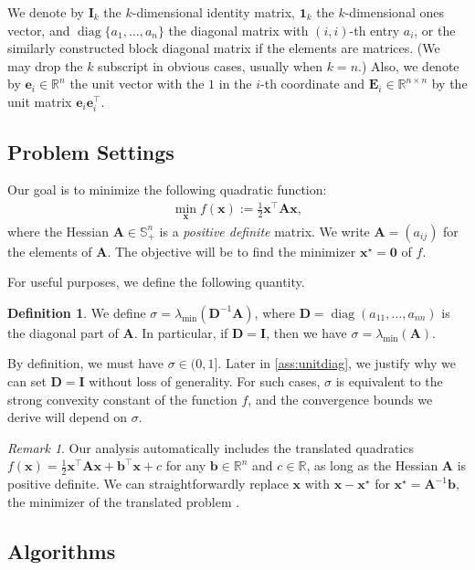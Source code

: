 \documentclass{article}
\theoremstyle{plain}
\theoremstyle{definition}
\newtheorem{definition}[theorem]{Definition}
\theoremstyle{remark}
\newtheorem*{remark*}{Remark} %
\def\vone{{\bm{1}}}
\def\vb{{\bm{b}}}
\def\ve{{\bm{e}}}
\def\vx{{\bm{x}}}
\def\mA{{\bm{A}}}
\def\mD{{\bm{D}}}
\def\mE{{\bm{E}}}
\def\mI{{\bm{I}}}
\def\sS{{\mathbb{S}}}
\newcommand{\R}{\mathbb{R}}
\DeclareMathOperator{\diag}{diag}
\begin{document}
We denote by $\mI_k$ the $k$-dimensional identity matrix, $\vone_k$ the $k$-dimensional ones vector, and $\diag\{a_1, \dots, a_n\}$ the diagonal matrix with $(i, i)$-th entry $a_i$, or the similarly constructed block diagonal matrix if the elements are matrices.
(We may drop the $k$ subscript in obvious cases, usually when $k = n$.)
Also, we denote by $\ve_i \in \R^{n}$ the unit vector with the $1$ in the $i$-th coordinate and $\mE_i \in \R^{n \times n}$ by the unit matrix $\ve_i \ve_i^{\top}$.

\subsection{Problem Settings}

Our goal is to minimize the following quadratic function:
\begin{align*}
    \min_{\vx} f(\vx) := \frac{1}{2} \vx^{\top} \mA \vx,
\end{align*}
where the Hessian $\mA \in \sS_{+}^{n}$ is a \emph{positive definite} matrix.
We write $\mA = (a_{ij})$ for the elements of $\mA$.
The objective will be to find the minimizer $\vx^{\star} = \bm{0}$ of $f$.

For useful purposes, we define the following quantity.
\begin{definition}
    We define $\sigma = \lambda_{\min} (\mD^{-1} \mA)$, where $\mD = \diag(a_{11}, \dots, a_{nn})$ is the diagonal part of $\mA$.
    In particular, if $\mD = \mI$, then we have $\sigma = \lambda_{\min} (\mA)$.
\end{definition}

By definition, we must have $\sigma \in (0, 1]$.
Later in \cref{ass:unitdiag}, we justify why we can set $\mD = \mI$ without loss of generality.
For such cases, $\sigma$ is equivalent to the strong convexity constant of the function $f$, and the convergence bounds we derive will depend on $\sigma$.

\begin{remark*}
    Our analysis automatically includes the translated quadratics $f(\vx) = \frac{1}{2} \vx^{\top} \mA \vx + \vb^{\top} \vx + c$ for any $\vb \in \R^{n}$ and $c \in \R$, as long as the Hessian $\mA$ is positive definite.
    We can straightforwardly replace $\vx$ with $\vx - \vx^{\star}$ for $\vx^{\star} = \mA^{-1} \vb$, the minimizer of the translated problem \citet{wright17}.
\end{remark*}

\subsection{Algorithms}
\label{sec:2.2}
\end{document}
